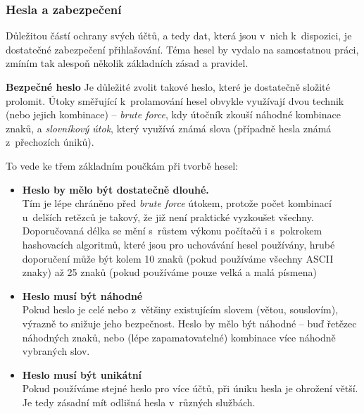 

\subsubsection*{Hesla a zabezpečení}
Důležitou částí ochrany svých účtů, a tedy dat, která jsou v~nich k~dispozici, je dostatečné zabezpečení přihlašování. Téma hesel by vydalo na samostatnou práci, zmíním tak alespoň několik základních zásad a pravidel.


\textbf{Bezpečné heslo}
Je důležité zvolit takové heslo, které je dostatečně složité prolomit. Útoky směřující k~prolamování hesel obvykle využívají dvou technik (nebo jejich kombinace) -- \textit{brute force}, kdy útočník zkouší náhodné kombinace znaků, a \textit{slovníkový útok}, který využívá známá slova (případně hesla známá z~přechozích úniků).

To vede ke třem základním poučkám při tvorbě hesel:

\begin{itemize}
	\item \textbf{Heslo by mělo být dostatečně dlouhé.}\\
	Tím je lépe chráněno před \textit{brute force} útokem, protože počet kombinací u~delších retězců je takový, že již není praktické vyzkoušet všechny. Doporučovaná délka se mění s~růstem výkonu počítačů i s~pokrokem hashovacích algoritmů, které jsou pro uchovávání hesel používány, hrubé doporučení může být kolem 10 znaků (pokud používáme všechny ASCII znaky) až 25 znaků (pokud používáme pouze velká a malá písmena)

	\item \textbf{Heslo musí být náhodné}\\
	Pokud heslo je celé nebo z~většiny existujícím slovem (větou, souslovím), výrazně to snižuje jeho bezpečnost. Heslo by mělo být náhodné -- buď řetězec náhodných znaků, nebo (lépe zapamatovatelné) kombinace více náhodně vybraných slov.

	\item \textbf{Heslo musí být unikátní}\\
	Pokud používáme stejné heslo pro více účtů, při úniku hesla je ohrožení větší. Je tedy zásadní mít odlišná hesla v~různých službách. 

\end{itemize}

